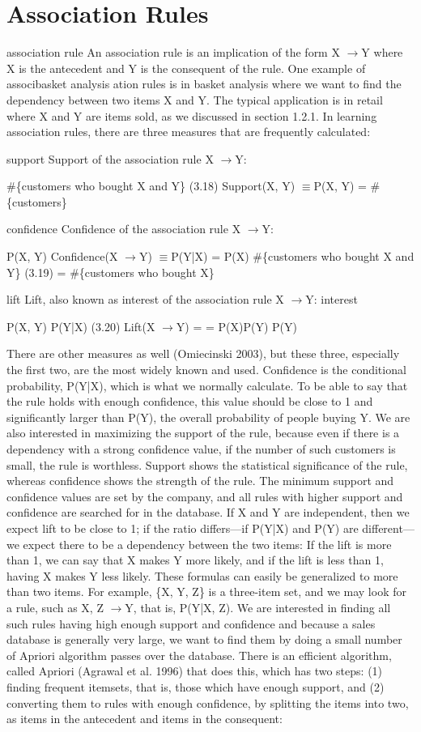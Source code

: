 \section{Association Rules}

association rule An association rule is an implication of the form X $\to$Y where X is the antecedent and Y is the consequent of the rule. One example of associbasket analysis ation rules is in basket analysis where we want to find the dependency between two items X and Y. The typical application is in retail where X and Y are items sold, as we discussed in section 1.2.1. In learning association rules, there are three measures that are frequently calculated:

support Support of the association rule X $\to$Y:

\#\{customers who bought X and Y\} (3.18) Support(X, Y) $\equiv$P(X, Y) = \#\{customers\}

confidence Confidence of the association rule X $\to$Y:

P(X, Y) Confidence(X $\to$Y) $\equiv$P(Y|X) = P(X) \#\{customers who bought X and Y\} (3.19) = \#\{customers who bought X\}

lift Lift, also known as interest of the association rule X $\to$Y: interest

P(X, Y) P(Y|X) (3.20) Lift(X $\to$Y) = = P(X)P(Y) P(Y)

There are other measures as well (Omiecinski 2003), but these three, especially the first two, are the most widely known and used. Confidence is the conditional probability, P(Y|X), which is what we normally calculate. To be able to say that the rule holds with enough confidence, this value should be close to 1 and significantly larger than P(Y), the overall probability of people buying Y. We are also interested in maximizing the support of the rule, because even if there is a dependency with a strong confidence value, if the number of such customers is small, the rule is worthless. Support shows the statistical significance of the rule, whereas confidence shows the strength of the rule. The minimum support and confidence values are set by the company, and all rules with higher support and confidence are searched for in the database. If X and Y are independent, then we expect lift to be close to 1; if the ratio differs---if P(Y|X) and P(Y) are different---we expect there to be a dependency between the two items: If the lift is more than 1, we can say that X makes Y more likely, and if the lift is less than 1, having X makes Y less likely. These formulas can easily be generalized to more than two items. For example, \{X, Y, Z\} is a three-item set, and we may look for a rule, such as X, Z $\to$Y, that is, P(Y|X, Z). We are interested in finding all such rules having high enough support and confidence and because a sales database is generally very large, we want to find them by doing a small number of Apriori algorithm passes over the database. There is an efficient algorithm, called Apriori (Agrawal et al. 1996) that does this, which has two steps: (1) finding frequent itemsets, that is, those which have enough support, and (2) converting them to rules with enough confidence, by splitting the items into two, as items in the antecedent and items in the consequent:

